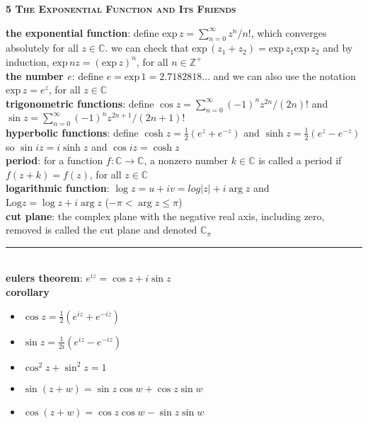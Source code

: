 \documentclass[a4paper]{article}
\newcommand*\abs[1]{\vert #1 \vert}
\newcommand*\linesep[0]{\noindent\rule{\textwidth}{0.5pt}\\}
\newcommand*\e[1]{\text{exp} \, #1}
\begin{document}
\begin{framed}
	\begin{center}
		\textbf{\textsc{5 The Exponential Function and Its Friends}}
	\end{center}
	\textbf{the exponential function}: define $\e{z} = \sum_{n=0}^\infty z^n / n!$, which converges absolutely for all $z \in \mathbb{C}$. we can check that $\e{(z_1 + z_2)} = \e{z_1}\e{z_2}$ and by induction, $\e{nz} = (\e{z})^n$, for all $n \in \mathbb{Z}^+$\\
	
	\noindent
	\textbf{the number $e$}: define $e = \e{1} = 2.7182818 \dots$ and we can also use the notation $\e{z} = e^z$, for all $z \in \mathbb{C}$\\
	
	\noindent
	\textbf{trigonometric functions}: define $\cos z = \sum_{n=0}^\infty (-1)^n z^{2n} / (2n)!$ and $\sin z = \sum_{n=0}^\infty (-1)^n z^{2n + 1} / (2n + 1)!$\\
	
	\noindent
	\textbf{hyperbolic functions}: define $\cosh z = \frac{1}{2}(e^z + e^{-z})$ and $\sinh z = \frac{1}{2}(e^z - e^{-z})$ so $\sin iz = i\sinh z$ and $\cos iz = \cosh z$\\
	
	\noindent
	\textbf{period}: for a function $f: \mathbb{C} \rightarrow \mathbb{C}$, a nonzero number $k \in \mathbb{C}$ is called a period if $f(z + k) = f(z)$, for all $z \in \mathbb{C}$\\
	
	\noindent
	\textbf{logarithmic function}: $\log z = u + iv = log \abs{z} + i \arg z$ and $\text{Log} z = \log z + i \arg z$ ($-\pi < \arg z \leq \pi$)\\
	
	\noindent
	\textbf{cut plane}: the complex plane with the negative real axis, including zero, removed is called the cut plane and denoted $\mathbb{C}_\pi$
	
	\linesep
	
	\noindent
	\textbf{eulers theorem}: $e^{iz} = \cos z + i \sin z$\\
	
	\noindent
	\textbf{corollary}
		\begin{multicols}{3}
		\begin{itemize}
			\item $\cos z = \frac{1}{2}(e^{iz} + e^{-iz})$
			\item $\sin z = \frac{1}{2i}(e^{iz} - e^{-iz})$
			\item $\cos^2 z + \sin^2 z = 1$
		\end{itemize}
	\end{multicols}
	\begin{multicols}{2}
		\begin{itemize}
			\item $\sin(z + w) = \sin z \cos w + \cos z \sin w$
			\item $\cos(z + w) = \cos z \cos w - \sin z \sin w$
		\end{itemize}
	\end{multicols}
	

\end{framed}
\end{document}
